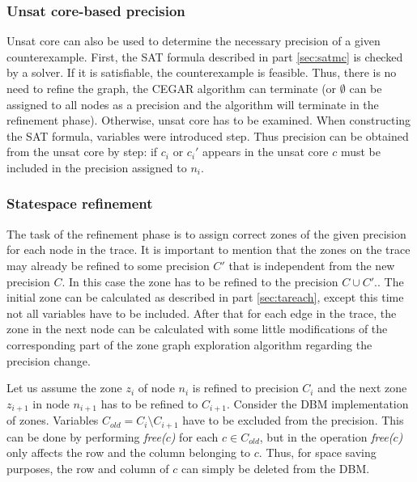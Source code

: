 
\subsubsection{Unsat core-based precision}

Unsat core can also be used to determine the necessary precision of a given counterexample. First, the SAT formula described in part \ref{sec:satmc} is checked by a solver. If it is satisfiable, the counterexample is feasible. Thus, there is no need to refine the graph, the CEGAR algorithm can terminate (or $\emptyset$ can be assigned to all nodes as a precision and the algorithm will terminate in the refinement phase). Otherwise, unsat core has to be examined. When constructing the SAT formula, variables were introduced step. Thus precision can be obtained from the unsat core by step: if $c_i$ or $c_i'$ appears in the unsat core $c$ must be included in the precision assigned to $n_i$.


\subsubsection{Statespace refinement}

The task of the refinement phase is to assign correct zones of the given precision for each node in the trace. It is important to mention that the zones on the trace may already be refined to some precision $C'$ that is independent from the new precision $C$. In this case the zone has to be refined to the precision $C \cup C'.$.  The initial zone can be calculated as described in part \ref{sec:tareach}, except this time not all variables have to be included.  After that for each edge in the trace, the zone in the next node can be calculated with some little modifications of the corresponding part of the zone graph exploration algorithm regarding the precision change.

Let us assume the zone $z_i$ of node $n_i$ is refined to precision $C_i$ and the next zone $z_{i+1}$ in node $n_{i+1}$ has to be refined to $C_{i+1}$. Consider the DBM implementation of zones. Variables $C_{old}=C_{i} \setminus C_{i+1}$ have to be excluded from the precision. This can be done by performing \emph{free($c$)} for each $c \in C_{old}$, but in \cite{bengtsson2004timed} the operation \emph{free($c$)} only affects the row and the column belonging to $c$. Thus, for space saving purposes, the row and column of $c$ can simply be deleted from the DBM. 

